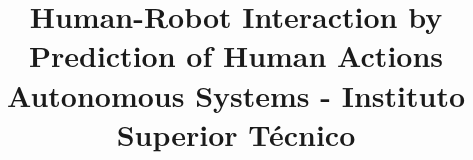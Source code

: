 

%
\title{Human-Robot Interaction by Prediction of Human Actions\\ Autonomous Systems - Instituto Superior T\'{e}cnico}


\author{
\and
{}
\and
{}
\and
{}
\and
{}
}

\maketitle



%
\IEEEpeerreviewmaketitle








